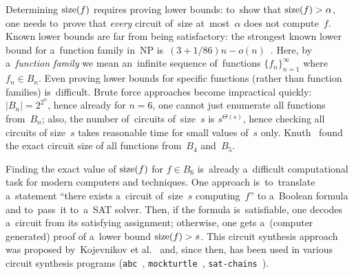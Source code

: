 Determining $\operatorname{size}(f)$ requires
proving lower bounds:
to~show that $\operatorname{size}(f)> \alpha$,
one needs to~prove that \emph{every} circuit
of~size at~most~$\alpha$ does not compute~$f$.
Known lower bounds are far from being satisfactory:
the strongest known lower bound for a~function family
in~NP is~$(3+1/86)n-o(n)$~\cite{DBLP:conf/focs/FindGHK16}.
Here, by a~\emph{function family} we mean an~infinite sequence of~functions $\{f_n\}_{n=1}^{\infty}$ where $f_n \in B_n$.
%
Even proving lower bounds for specific functions (rather than function families) is~difficult. Brute force approaches become impractical quickly: $|B_n|=2^{2^n}$, hence already for $n=6$, one cannot just enumerate all
functions from~$B_n$; also, the number of~circuits
of~size~$s$ is $s^{\Theta(s)}$, hence checking all circuits of size~$s$ takes reasonable time for small values of~$s$ only.
Knuth~\cite{Knuth:2008:ACP:1377542} found the exact circuit size of all functions from~$B_4$ and~$B_5$.

Finding the exact value of $\operatorname{size}(f)$ for $f \in B_6$
is~already a~difficult computational task for modern
computers and techniques. One approach
is~to~translate a~statement ``there exists a~circuit
of~size~$s$ computing~$f$'' to a~Boolean formula and
to~pass~it to~a~SAT solver. Then, if the formula
is~satisfiable, one decodes a~circuit from its satisfying
assignment; otherwise, one gets a~(computer generated) proof of a~lower bound $\operatorname{size}(f) > s$. This circuit synthesis approach was proposed
by~Kojevnikov et al.~\cite{DBLP:conf/sat/KojevnikovKY09}
and, since then, has been used in various circuit synthesis programs (\texttt{abc}~\cite{abc}, \texttt{mockturtle}~\cite{EPFLLibraries}, \texttt{sat-chains}~\cite{knuthreduction}).

